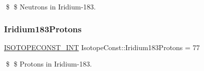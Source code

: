 \$ \$ Neutrons in Iridium-\/183. \mbox{\label{group___isotope_const-_iridium-_ir183_gaadf6c00a1e99c0db1e58bdcf24077c23}} 
\subsubsection{\texorpdfstring{Iridium183\+Protons}{Iridium183Protons}}
{\footnotesize\ttfamily \mbox{\hyperlink{group___isotope_const-_macros_ga5f18360b3e99483a35c32d789e62621c}{I\+S\+O\+T\+O\+P\+E\+C\+O\+N\+S\+T\+\_\+\+I\+NT}} Isotope\+Const\+::\+Iridium183\+Protons = 77}

\$ \$ Protons in Iridium-\/183. 